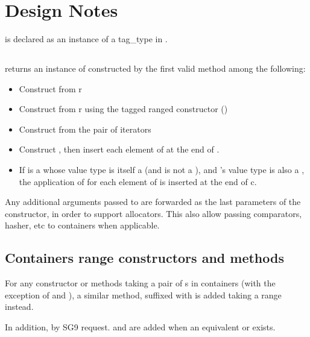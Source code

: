 \documentclass{wg21}
\begin{document}
\section{Design Notes}

 is declared as an instance of a tag_type  in .

\subsection{}

 returns an instance  of  constructed by the first valid method among the following:
\begin{itemize}
    \item Construct  from r
    \item Construct  from r using the tagged ranged constructor ()
    \item Construct  from the pair of iterators 
    \item Construct , then insert each element of  at the end of .
    \item If  is a  whose value type is itself a  (and is not a ), and 's value type is also a , the application of  for each element of  is inserted
    at the end of c.
\end{itemize}

Any additional arguments passed to  are forwarded as the last parameters of the constructor, in order to support allocators.
This also allow passing comparators, hasher, etc to containers when applicable.

\subsection{Containers range constructors and methods}

For any constructor or methods taking a pair of s in containers (with the exception of  and ), a similar method, suffixed with  is added taking a range instead.

In addition, by SG9 request.  and  are added when an equivalent 
or  exists.
\end{document}
